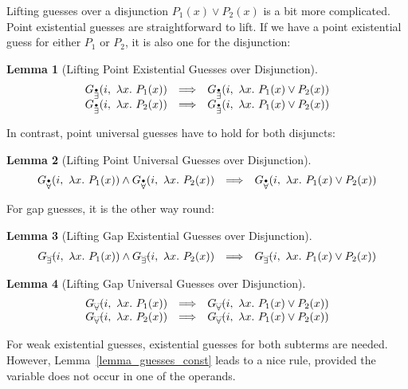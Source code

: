 \documentclass[a4paper,12pt,DIV=12,oneside]{scrbook}
\newtheorem{lemma}{Lemma}[section]
\theoremstyle{definition}
\theoremstyle{remark}
\newcommand{\GEP}{\ensuremath{G_{\accentset{\bullet}{\exists}}}}
\newcommand{\GEG}{\ensuremath{G_{\accentset{\_\,\_}{\exists}}}}
\newcommand{\GUP}{\ensuremath{G_{\accentset{\bullet}{\forall}}}}
\newcommand{\GUG}{\ensuremath{G_{\accentset{\_\,\_}{\forall}}}}
\begin{document}
Lifting guesses over a disjunction $P_1(x) \vee P_2(x)$ is a bit more
complicated. Point existential guesses are straightforward to lift. If we
have a point existential guess for either $P_1$ or $P_2$, it is also one for
the disjunction:
%
\begin{lemma}[Lifting Point Existential Guesses over Disjunction]\label{lemma_guesses_lift_disj_T}
\[
\begin{array}{l@{\quad}l@{\quad}l}
\GEP(i,\ \lambda x.\ P_1(x)) & \Longrightarrow & \GEP(i,\ \lambda x.\ P_1(x) \vee P_2(x)) \\
\GEP(i,\ \lambda x.\ P_2(x)) & \Longrightarrow & \GEP(i,\ \lambda x.\ P_1(x) \vee P_2(x))
\end{array}
\]
\end{lemma}
%
In contrast, point universal guesses have to hold for both disjuncts:
\begin{lemma}[Lifting Point Universal Guesses over Disjunction]\label{lemma_guesses_lift_disj_F}
\[
\begin{array}{l@{\quad}l@{\quad}l}
\GUP(i,\ \lambda x.\ P_1(x)) \wedge \GUP(i,\ \lambda x.\ P_2(x)) & \Longrightarrow & \GUP(i,\ \lambda x.\ P_1(x) \vee P_2(x))
\end{array}
\]
\end{lemma}
%
For gap guesses, it is the other way round:
%
\begin{lemma}[Lifting Gap Existential Guesses over Disjunction]\label{lemma_guesses_lift_disj_SE}
\[
\begin{array}{l@{\quad}l@{\quad}l}
\GEG(i,\ \lambda x.\ P_1(x)) \wedge \GEG(i,\ \lambda x.\ P_2(x)) & \Longrightarrow & \GEG(i,\ \lambda x.\ P_1(x) \vee P_2(x))
\end{array}
\]
\end{lemma}
%
\begin{lemma}[Lifting Gap Universal Guesses over Disjunction]\label{lemma_guesses_lift_disj_SA}
\[
\begin{array}{l@{\quad}l@{\quad}l}
\GUG(i,\ \lambda x.\ P_1(x)) & \Longrightarrow & \GUG(i,\ \lambda x.\ P_1(x) \vee P_2(x)) \\
\GUG(i,\ \lambda x.\ P_2(x)) & \Longrightarrow & \GUG(i,\ \lambda x.\ P_1(x) \vee P_2(x))
\end{array}
\]
\end{lemma}

For weak existential guesses, existential guesses for both subterms are needed. However,
Lemma~\ref{lemma_guesses_const} leads to a nice rule, provided the
variable does not occur in one of the operands.
\end{document}
